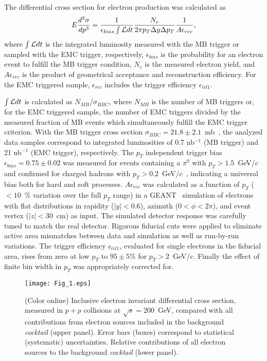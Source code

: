 \documentclass[aps,prl,superscriptaddress,showpacs,floatfix,twocolumn]{revtex4}
\begin{document}
The differential cross section for electron production was calculated as
\begin{equation}
E \frac{d^3\sigma}{dp^3} = \frac{1}{\epsilon_{bias} \int{{\cal{L}}dt}}
			   \frac{N_e}{2\pi p_T \Delta y \Delta p_T}
			   \frac{1}{A \epsilon_{rec}},
\end{equation}
where $\int{{\cal{L}}dt}$ is the integrated luminosity measured with the MB 
trigger or sampled with the EMC trigger, respectively, $\epsilon_{bias}$
is the probability for an electron event to fulfill the MB trigger condition, 
$N_e$ is the measured electron yield, and $A \epsilon_{rec}$ is the product of 
geometrical acceptance and reconstruction efficiency. 
For the EMC triggered sample, $\epsilon_{rec}$ includes the trigger efficiency
$\epsilon_{lvl1}$.

$\int{{\cal{L}}dt}$ is calculated as $N_{MB}/\sigma_{BBC}$, where $N_{MB}$ 
is the number of MB triggers or, for the EMC triggered sample, the number 
of EMC triggers divided by the measured fraction of MB events which 
simultaneously fulfill the EMC trigger criterion.
With the MB trigger cross section 
$\sigma_{BBC} = 21.8 \pm 2.1$~mb~\cite{phenix_pi0pp}, the analyzed data 
samples correspond to integrated luminosities of 0.7 nb$^{-1}$ (MB trigger)
and 21 nb$^{-1}$ (EMC trigger), respectively.
The $p_T$ independent trigger bias $\epsilon_{bias} = 0.75 \pm 0.02$ was 
measured for events containing a $\pi^0$ with 
$p_T > 1.5$~GeV/$c$~\cite{phenix_pi0pp} and confirmed for charged hadrons with
$p_T > 0.2$~GeV/$c$~\cite{phenix_ppg050}, indicating a universal bias both for 
hard and soft processes.
$A \epsilon_{rec}$ was calculated as a function of $p_T$ ($< 10$~\% variation 
over the full $p_T$ range) in a GEANT~\cite{geant} simulation of electrons 
with flat distributions in rapidity ($|y| < 0.6$), azimuth ($0 < \phi < 2\pi$),
and event vertex ($|z| < 30$~cm) as input. 
The simulated detector response was carefully tuned to match the real detector.
Rigorous fiducial cuts were applied to eliminate active area mismatches 
between data and simulation as well as run-by-run variations.
The trigger efficiency $\epsilon_{lvl1}$, evaluated for single electrons
in the fiducial area, rises from zero at low $p_T$ to $95 \pm 5$\% for 
$p_T > 2$~GeV/$c$.
Finally the effect of finite bin width in $p_T$ was appropriately corrected 
for.

\begin{figure}[t]
\texttt{[image: Fig\_1.eps]}
\caption{\label{fig:PPG037_Fig1} (Color online) Inclusive electron invariant
differential cross section, measured in $p + p$ collisions at 
$\sqrt{s} = 200$~GeV, compared with all contributions from electron sources 
included in the background {\it cocktail} (upper panel). Error bars (boxes) 
correspond to statistical (systematic) uncertainties. Relative contributions
of all electron sources to the background {\it cocktail} (lower panel).}
\end{figure}
\end{document}
